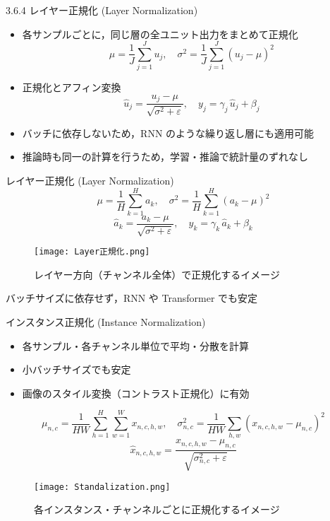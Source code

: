 \documentclass[dvipdfmx,autodetect-engine]{beamer}
\begin{document}
\begin{frame}{3.6.4 レイヤー正規化 (Layer Normalization)}
  \begin{itemize}
    \item 各サンプルごとに，同じ層の全ユニット出力をまとめて正規化
      \[
        \mu = \frac{1}{J}\sum_{j=1}^J u_j,\quad
        \sigma^2 = \frac{1}{J}\sum_{j=1}^J (u_j - \mu)^2
      \]
    \item 正規化とアフィン変換
      \[
        \hat u_j
         = \frac{u_j - \mu}{\sqrt{\sigma^2 + \varepsilon}},\quad
        y_j = \gamma_j\,\hat u_j + \beta_j
      \tag{3.17}
      \]
    \item バッチに依存しないため，RNN のような繰り返し層にも適用可能
    \item 推論時も同一の計算を行うため，学習・推論で統計量のずれなし
  \end{itemize}
\end{frame}

\begin{frame}{レイヤー正規化 (Layer Normalization)}
  \[
    \mu = \frac1H\sum_{k=1}^H a_k, \quad
    \sigma^2 = \frac1H\sum_{k=1}^H (a_k-\mu)^2
  \]
  \[
    \hat a_k
      = \frac{a_k-\mu}{\sqrt{\sigma^2+\varepsilon}}, \quad
    y_k
      = \gamma_k\,\hat a_k + \beta_k
  \]
  \vspace{0.8em}
  \begin{figure}
    \centering
    \texttt{[image: Layer正規化.png]}
    \caption*{レイヤー方向（チャンネル全体）で正規化するイメージ}
  \end{figure}
  \vspace{-0.5em}
  バッチサイズに依存せず，RNN や Transformer でも安定  
\end{frame}

\begin{frame}{インスタンス正規化 (Instance Normalization)}
  \begin{itemize}
    \item 各サンプル・各チャンネル単位で平均・分散を計算
    \item 小バッチサイズでも安定  
    \item 画像のスタイル変換（コントラスト正規化）に有効
  \end{itemize}
  \[
    \mu_{n,c} = \frac1{HW}\sum_{h=1}^H\sum_{w=1}^W x_{n,c,h,w}, \quad
    \sigma_{n,c}^2 = \frac1{HW}\sum_{h,w}(x_{n,c,h,w}-\mu_{n,c})^2
  \]
  \[
    \hat x_{n,c,h,w}
      = \frac{x_{n,c,h,w}-\mu_{n,c}}{\sqrt{\sigma_{n,c}^2+\varepsilon}}
  \]
  \vspace{0.8em}
  \begin{figure}
    \centering
    \texttt{[image: Standalization.png]}
    \caption*{各インスタンス・チャンネルごとに正規化するイメージ}
  \end{figure}
\end{frame}
\end{document}
